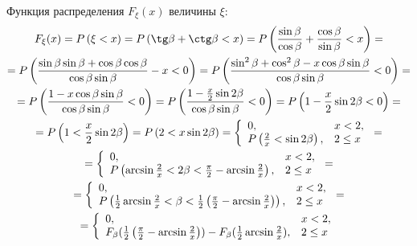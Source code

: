 Функция распределения $F_\xi(x)$ величины $\xi$:
\begin{multline}
    F_\xi(x)
    = \probability{\xi < x}
    = \probability{\tg \beta + \ctg \beta < x}
    = \probability{\frac{\sin \beta}{\cos \beta} + \frac{\cos \beta}{\sin \beta} < x} = \\
    = \probability{\frac{\sin \beta \sin \beta + \cos \beta \cos \beta}{\cos \beta \sin \beta} - x < 0}
    = \probability{\frac{\sin^2 \beta + \cos^2 \beta - x \cos \beta \sin \beta}{\cos \beta \sin \beta} < 0} = \\
    = \probability{\frac{1 - x \cos \beta \sin \beta}{\cos \beta \sin \beta} < 0}
    = \probability{\frac{1 - \frac{x}{2} \sin 2 \beta}{\cos \beta \sin \beta} < 0}
    = \probability{1 - \frac{x}{2} \sin 2 \beta < 0} = \\
    = \probability{1 < \frac{x}{2} \sin 2 \beta}
    = \probability{2 < x \sin 2 \beta}
    = \left \{
    \begin{array}{ll}
        0,                                        & x < 2 , \\
        \probability{\frac{2}{x} < \sin 2 \beta}, & 2 \le x
    \end{array}
    \right . = \\
    = \left \{
    \begin{array}{ll}
        0,                                                                                 & x < 2 , \\
        \probability{\arcsin \frac{2}{x} < 2 \beta < \frac{\pi}{2} - \arcsin \frac{2}{x}}, & 2 \le x
    \end{array}
    \right . = \\
    = \left \{
    \begin{array}{ll}
        0,                                                                                                                        & x < 2 , \\
        \probability{\frac{1}{2} \arcsin \frac{2}{x} < \beta < \frac{1}{2} \left ( \frac{\pi}{2} - \arcsin \frac{2}{x} \right )}, & 2 \le x
    \end{array}
    \right . = \\
    = \left \{
    \begin{array}{ll}
        0,                                                                                                                    & x < 2 , \\
        F_\beta(\frac{1}{2} \left ( \frac{\pi}{2} - \arcsin \frac{2}{x} \right )) - F_\beta(\frac{1}{2} \arcsin \frac{2}{x}), & 2 \le x
    \end{array}
    \right .
\end{multline}

